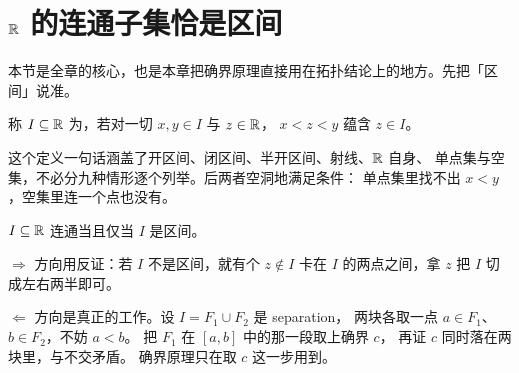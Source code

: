 \section{\(\mathbb{R}\) 的连通子集恰是区间}
\label{sec:interval-connected}

本节是全章的核心，也是本章把确界原理直接用在拓扑结论上的地方。先把「区间」说准。

\begin{definition}[区间]
  \label{def:interval}
  称 \(I \subseteq \mathbb{R}\) 为，若对一切 \(x,y \in I\) 与 \(z \in \mathbb{R}\)，
  \(x < z < y\) 蕴含 \(z \in I\)。
\end{definition}

\begin{remark}
  这个定义一句话涵盖了开区间、闭区间、半开区间、射线、\(\mathbb{R}\) 自身、
  单点集与空集，不必分九种情形逐个列举。后两者空洞地满足条件：
  单点集里找不出 \(x<y\)，空集里连一个点也没有。
\end{remark}

\begin{theorem}[区间刻画]
  \label{thm:interval-connected}
  \(I \subseteq \mathbb{R}\) 连通当且仅当 \(I\) 是区间。
\end{theorem}

\begin{strategy}
  \(\Rightarrow\) 方向用反证：若 \(I\) 不是区间，就有个 \(z \notin I\) 卡在 \(I\)
  的两点之间，拿 \(z\) 把 \(I\) 切成左右两半即可。

  \(\Leftarrow\) 方向是真正的工作。设 \(I = F_{1} \cup F_{2}\) 是 separation，
  两块各取一点 \(a \in F_{1}\)、\(b \in F_{2}\)，不妨 \(a<b\)。
  把 \(F_{1}\) 在 \([a,b]\) 中的那一段取上确界 \(c\)，
  再证 \(c\) 同时落在两块里，与不交矛盾。
  确界原理只在取 \(c\) 这一步用到。
\end{strategy}

